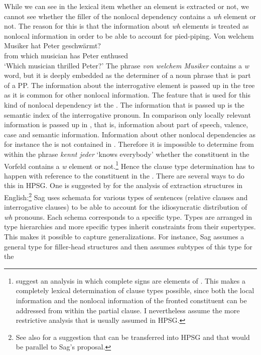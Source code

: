 While we can see in the lexical item whether an element is extracted or not, we cannot see whether
the filler of the nonlocal dependency contains a \emph{wh} element or not. The reason for this is
that the information about \emph{wh} elements is treated as nonlocal information in order to be able
to account for pied-piping.
\ea
\gll Von welchem Musiker hat Peter geschwärmt?\\
     from which musician has Peter enthused\\
\glt `Which musician thrilled Peter?'
\z
The phrase \emph{von welchem Musiker} contains a \emph{w} word, but it is deeply embedded as the
determiner of a noun phrase that is part of a PP. The information about the interrogative element is
passed up in the tree as it is common for other nonlocal information. The feature that is used for
this kind of nonlocal dependency ist the \quef. The information that is passed up is the semantic
index of the interrogative pronoun. In comparison only locally relevant information is passed up in
\slasch, that is, information about part of speech, valence, case and semantic
information. Information about other nonlocal dependencies as for instance the \quev is not
contained in \slasch. Therefore it is impossible to determine from within the phrase \emph{kennt jeder} `knows everybody'
whether the constituent in the Vorfeld contains a \emph{w} element or not.\footnote{
  \citet{HN94b} suggest an analysis in which complete signs are elements of \slasch. This makes a
  completely lexical determination of clause types possible, since both the local information and
  the nonlocal information of the fronted constituent can be addressed from within the partial
  clause. I nevertheless assume the more restrictive analysis that is usually assumed in HPSG.%
} Hence the clause type determination has to happen with reference to the constituent in the
\vf. There are several ways to do this in HPSG. One is suggested by \citet{Sag2010b} for the
analysis of extraction structures in English:\footnote{
  See also  for a suggestion that can be transferred into HPSG and that would be
  parallel to Sag's proposal.%
} Sag uses schemata for various types of sentences (relative clauses and interrogative clauses) to
be able to account for the idiosyncratic distribution of \emph{wh} pronouns. Each schema corresponds
to a specific type. Types are arranged in type hierarchies and more specific types inherit
constraints from their supertypes. This makes it possible to capture generalizations. For instance,
Sag assumes a general type for filler-head structures and then assumes subtypes of this type for the

